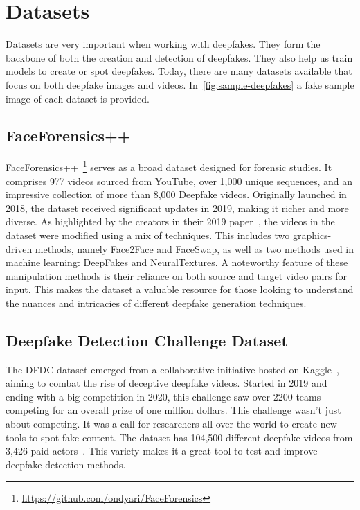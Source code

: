 \section{Datasets}
Datasets are very important when working with deepfakes. They form the backbone of both
the creation and detection of deepfakes. They also help us train models to create or spot
deepfakes. Today, there are many datasets available that focus on both deepfake images
and videos. In~\autoref{fig:sample-deepfakes} a fake sample image of each dataset is provided.

\subsection{FaceForensics++}\label{section:ff++}
FaceForensics++~\footnote{\url{https://github.com/ondyari/FaceForensics}} serves as a
broad dataset designed for forensic studies. It
comprises 977 videos sourced from YouTube, over 1,000 unique sequences, and an
impressive collection of more than 8,000 Deepfake videos. Originally launched in
2018, the dataset received significant updates in 2019, making it richer and more
diverse. As highlighted by the creators in their 2019 paper~\cite{roessler2019faceforensicspp},
the videos in the dataset were modified using a mix of techniques. This includes two
graphics-driven methods, namely Face2Face and FaceSwap, as well as two methods used
in machine learning: DeepFakes and NeuralTextures. A noteworthy feature of these
manipulation methods is their reliance on both source and target video pairs for input.
This makes the dataset a valuable resource for those looking to understand the
nuances and intricacies of different deepfake generation techniques.

\subsection{Deepfake Detection Challenge Dataset}
The \ac{DFDC} dataset emerged from a collaborative initiative hosted on Kaggle~\cite{kaggle2020},
aiming to combat the rise of deceptive deepfake videos. Started in 2019 and ending
with a big competition in 2020, this challenge saw over 2200 teams competing for an
overall prize of one million dollars. This challenge wasn't just about competing.
It was a call for researchers all over the world to create new tools to spot fake
content. The dataset has 104,500 different deepfake videos from 3,426 paid
actors~\cite{dolhansky2020deepfake}. This variety makes it a great tool to test and improve deepfake detection
methods.

